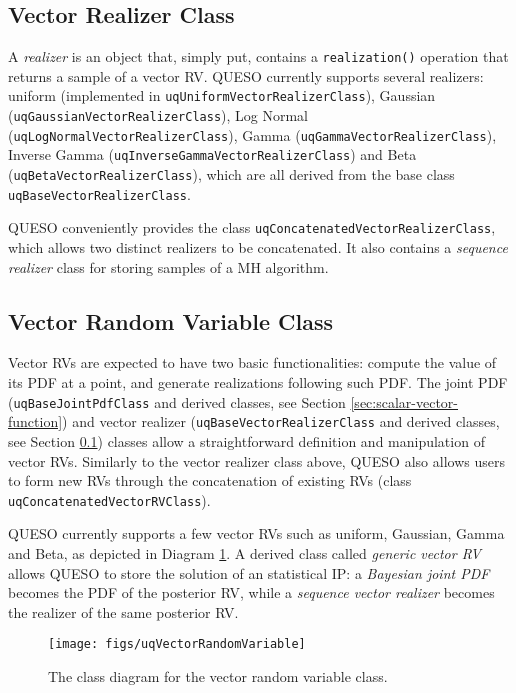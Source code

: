 \subsection{Vector Realizer Class}\label{sec:vector-realizer-class}
%
A {\it realizer} is an object that, simply put, contains a \verb+realization()+ operation that returns a sample of a vector RV.
QUESO currently supports several realizers: uniform (implemented in \verb+uqUniformVectorRealizerClass+), Gaussian (\verb+uqGaussianVectorRealizerClass+), Log Normal (\verb+uqLogNormalVectorRealizerClass+), Gamma (\verb+uqGammaVectorRealizerClass+), Inverse Gamma (\verb+uqInverseGammaVectorRealizerClass+) and Beta (\verb+uqBetaVectorRealizerClass+), which are all derived from the base class \verb+uqBaseVectorRealizerClass+. 

QUESO conveniently provides the class \verb+uqConcatenatedVectorRealizerClass+, which allows two distinct realizers to be concatenated.
It also contains a {\it sequence realizer} class for storing samples of a MH algorithm. 




\subsection{Vector Random Variable Class}
%
Vector RVs are expected to have two basic functionalities:
compute the value of its PDF at a point, and generate realizations following such PDF.
The joint PDF (\verb+uqBaseJointPdfClass+ and derived classes, see Section \ref{sec:scalar-vector-function}) and vector realizer  (\verb+uqBaseVectorRealizerClass+ and derived classes, see Section \ref{sec:vector-realizer-class}) classes allow a straightforward definition and manipulation of vector RVs. Similarly to the vector realizer class above, QUESO also allows users to form new RVs through the concatenation of existing RVs (class \verb+uqConcatenatedVectorRVClass+).

QUESO currently supports a few vector RVs such as uniform, Gaussian, Gamma and Beta, as depicted in Diagram \ref{fig-vector-rv-class}.
A derived class called {\it generic vector RV} allows QUESO to store the solution of an statistical IP:
a {\it Bayesian joint PDF} becomes the PDF of the posterior RV, while a {\it sequence vector realizer} becomes the realizer of the same posterior RV.



\begin{figure}[htpb]
\centering
\texttt{[image: figs/uqVectorRandomVariable]}
\vspace{-8pt}
\caption{The class diagram for the vector random variable class.}
\label{fig-vector-rv-class}
\end{figure}



